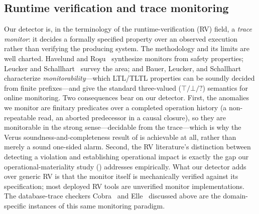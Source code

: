 \documentclass[journal,compsoc,10pt]{IEEEtran}
\providecommand{\citep}{\cite}
\theoremstyle{definition}
\theoremstyle{remark}
\begin{document}
\subsection{Runtime verification and trace monitoring}
\label{sec:related-rv}
Our detector is, in the terminology of the runtime-verification (RV)
field, a \emph{trace monitor}: it decides a formally specified property
over an observed execution rather than verifying the producing system.
The methodology and its limits are well charted. Havelund and
Ro\c{s}u~\citep{HavelundRosu2002} synthesize monitors from safety
properties; Leucker and Schallhart~\citep{LeuckerSchallhart2009} survey
the area; and Bauer, Leucker, and
Schallhart~\citep{BauerLeuckerSchallhart2011} characterize
\emph{monitorability}---which LTL/TLTL properties can be soundly decided
from finite prefixes---and give the standard three-valued
($\top/\bot/?$) semantics for online monitoring. Two consequences bear
on our detector. First, the anomalies we monitor are finitary
predicates over a completed operation history (a non-repeatable read,
an aborted predecessor in a causal closure), so they are monitorable in
the strong sense---decidable from the trace---which is why the Verus
soundness-and-completeness result of  is
achievable at all, rather than merely a sound one-sided alarm. Second,
the RV literature's distinction between detecting a violation and
establishing operational impact is exactly the gap our
operational-materiality study ()
addresses empirically. What our detector adds over generic RV is that
the monitor itself is mechanically verified against its specification;
most deployed RV tools are unverified monitor implementations. The
database-trace checkers Cobra~\citep{TanEtAl2020Cobra} and
Elle~\citep{Aphyr2020Elle} discussed above are the domain-specific
instances of this same monitoring paradigm.
\end{document}
